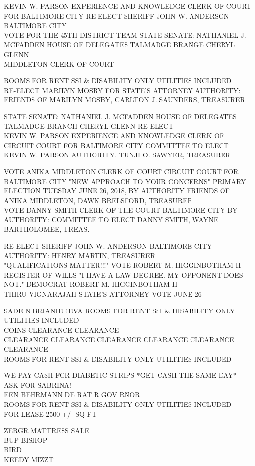 \documentclass[10pt,letterpaper]{article}
\begin{document}
KEVIN W. PARSON EXPERIENCE AND KNOWLEDGE CLERK OF COURT FOR BALTIMORE CITY RE{-}ELECT SHERIFF JOHN W. ANDERSON BALTIMORE CITY\\
VOTE FOR THE 45TH DISTRICT TEAM STATE SENATE: NATHANIEL J. MCFADDEN HOUSE OF DELEGATES TALMADGE BRANGE CHERYL GLENN\\
MIDDLETON CLERK OF COURT

ROOMS FOR RENT SSI \& DISABILITY ONLY UTILITIES INCLUDED\\
RE{-}ELECT MARILYN MOSBY FOR STATE'S ATTORNEY AUTHORITY: FRIENDS OF MARILYN MOSBY, CARLTON J. SAUNDERS, TREASURER

STATE SENATE: NATHANIEL J. MCFADDEN HOUSE OF DELEGATES TALMADGE BRANCH CHERYL GLENN RE{-}ELECT\\
KEVIN W. PARSON EXPERIENCE AND KNOWLEDGE CLERK OF CIRCUIT COURT FOR BALTIMORE CITY COMMITTEE TO ELECT KEVIN W. PARSON AUTHORITY: TUNJI O. SAWYER, TREASURER

VOTE ANIKA MIDDLETON CLERK OF COURT CIRCUIT COURT FOR BALTIMORE CITY "NEW APPROACH TO YOUR CONCERNS" PRIMARY ELECTION TUESDAY JUNE 26, 2018, BY AUTHORITY FRIENDS OF ANIKA MIDDLETON, DAWN BRELSFORD, TREASURER\\
VOTE DANNY SMITH CLERK OF THE COURT BALTIMORE CITY BY AUTHORITY: COMMITTEE TO ELECT DANNY SMITH, WAYNE BARTHOLOMEE, TREAS.

RE{-}ELECT SHERIFF JOHN W. ANDERSON BALTIMORE CITY AUTHORITY: HENRY MARTIN, TREASURER\\
"QUALIFICATIONS MATTER!!!" VOTE ROBERT M. HIGGINBOTHAM II REGISTER OF WILLS "I HAVE A LAW DEGREE.  MY OPPONENT DOES NOT."  DEMOCRAT ROBERT M. HIGGINBOTHAM II\\
THIRU VIGNARAJAH STATE'S ATTORNEY VOTE JUNE 26

SADE N BRIANIE 4EVA ROOMS FOR RENT SSI \& DISABILITY ONLY UTILITIES INCLUDED\\
COINS CLEARANCE CLEARANCE\\
CLEARANCE CLEARANCE CLEARANCE CLEARANCE CLEARANCE CLEARANCE\\
ROOMS FOR RENT SSI \& DISABILITY ONLY UTILITIES INCLUDED

WE PAY CA\$H FOR DIABETIC STRIPS *GET CASH THE SAME DAY* ASK FOR SABRINA!\\
EEN BEHRMANN DE RAT R GOV RNOR\\
ROOMS FOR RENT SSI \& DISABILITY ONLY UTILITIES INCLUDED\\
FOR LEASE 2500 +/{-} SQ FT

ZERGR MATTRESS SALE\\
BUP BISHOP\\
BIRD\\
KEEDY MIZZT
\end{document}
